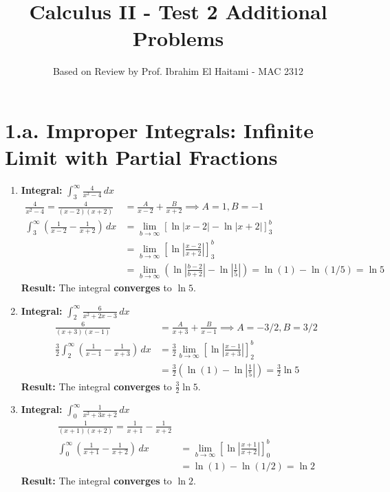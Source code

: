 \documentclass[12pt]{article}
\newcommand{\problemsettitle}[1]{\section*{#1}}
\begin{document}
\title{\textbf{Calculus II - Test 2 Additional Problems}}
\author{Based on Review by Prof. Ibrahim El Haitami - MAC 2312}
\date{}
\maketitle

\hrulefill
\vspace{1em}

\problemsettitle{1.a. Improper Integrals: Infinite Limit with Partial Fractions}

\begin{enumerate}
    \item \textbf{Integral: } $\displaystyle \int_{3}^{\infty} \frac{4}{x^2 - 4} \,dx$
    \begin{align*}
        \frac{4}{x^2 - 4} = \frac{4}{(x-2)(x+2)} &= \frac{A}{x-2} + \frac{B}{x+2} \implies A=1, B=-1 \\
        \int_{3}^{\infty} \left(\frac{1}{x-2} - \frac{1}{x+2}\right) \,dx &= \lim_{b \to \infty} \left[ \ln|x-2| - \ln|x+2| \right]_{3}^{b} \\
        &= \lim_{b \to \infty} \left[ \ln\left|\frac{x-2}{x+2}\right| \right]_{3}^{b} \\
        &= \lim_{b \to \infty} \left( \ln\left|\frac{b-2}{b+2}\right| - \ln\left|\frac{1}{5}\right| \right) = \ln(1) - \ln(1/5) = \ln 5
    \end{align*}
    \textbf{Result:} The integral \textbf{converges} to $\ln 5$.

    \item \textbf{Integral: } $\displaystyle \int_{2}^{\infty} \frac{6}{x^2 + 2x - 3} \,dx$
    \begin{align*}
        \frac{6}{(x+3)(x-1)} &= \frac{A}{x+3} + \frac{B}{x-1} \implies A=-3/2, B=3/2 \\
        \frac{3}{2} \int_{2}^{\infty} \left(\frac{1}{x-1} - \frac{1}{x+3}\right) \,dx &= \frac{3}{2} \lim_{b \to \infty} \left[ \ln\left|\frac{x-1}{x+3}\right| \right]_{2}^{b} \\
        &= \frac{3}{2} \left( \ln(1) - \ln\left|\frac{1}{5}\right| \right) = \frac{3}{2}\ln 5
    \end{align*}
    \textbf{Result:} The integral \textbf{converges} to $\frac{3}{2}\ln 5$.

    \item \textbf{Integral: } $\displaystyle \int_{0}^{\infty} \frac{1}{x^2+3x+2} \,dx$
    \begin{align*}
        \frac{1}{(x+1)(x+2)} = \frac{1}{x+1} - \frac{1}{x+2} \\
        \int_{0}^{\infty} \left(\frac{1}{x+1} - \frac{1}{x+2}\right) \,dx &= \lim_{b \to \infty} \left[ \ln\left|\frac{x+1}{x+2}\right| \right]_{0}^{b} \\
        &= \ln(1) - \ln(1/2) = \ln 2
    \end{align*}
    \textbf{Result:} The integral \textbf{converges} to $\ln 2$.


\end{enumerate}
\end{document}
